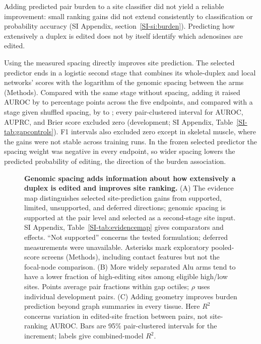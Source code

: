 \documentclass[9pt,twocolumn,twoside]{pnas-new}
\newcommand{\SIref}[1]{\ref*{SI-#1}}
\begin{document}
Adding predicted pair burden to a site classifier did not yield a reliable improvement: small ranking gains did not extend consistently to classification or probability accuracy (SI Appendix, section~\SIref{si:burden}). Predicting how extensively a duplex is edited does not by itself identify which adenosines are edited.

Using the measured spacing directly improves site prediction. The selected predictor ends in a logistic second stage that combines its whole-duplex and local networks' scores with the logarithm of the genomic spacing between the arms (Methods). Compared with the same stage without spacing, adding it raised AUROC by \GapStageVsNoGapAUROCMin{} to \GapStageVsNoGapAUROCMax{} percentage points across the five endpoints, and compared with a stage given shuffled spacing, by \GapStageVsShuffledAUROCMin{} to \GapStageVsShuffledAUROCMax{}; every pair-clustered interval for AUROC, AUPRC, and Brier score excluded zero (development; SI Appendix, Table~\SIref{tab:gapcontrols}). F1 intervals also excluded zero except in skeletal muscle, where the gains were not stable across training runs. In the frozen selected predictor the spacing weight was negative in every endpoint, so wider spacing lowers the predicted probability of editing, the direction of the burden association.

\begin{figure}[t!]
\centering

\caption{\textbf{Genomic spacing adds information about how extensively a duplex is edited and improves site ranking.} (A) The evidence map distinguishes selected site-prediction gains from supported, limited, unsupported, and deferred directions; genomic spacing is supported at the pair level and selected as a second-stage site input. SI Appendix, Table~\SIref{tab:evidencemap} gives comparators and effects. ``Not supported'' concerns the tested formulation; deferred measurements were unavailable. Asterisks mark exploratory pooled-score screens (Methods), including contact features but not the focal-node comparison. (B) More widely separated Alu arms tend to have a lower fraction of high-editing sites among eligible high/low sites. Points average pair fractions within gap octiles; $\rho$ uses individual development pairs. (C) Adding geometry improves burden prediction beyond graph summaries in every tissue. Here $R^2$ concerns variation in edited-site fraction between pairs, not site-ranking AUROC. Bars are 95\% pair-clustered intervals for the increment; labels give combined-model $R^2$.}
\label{fig:evidence}
\end{figure}
\end{document}
